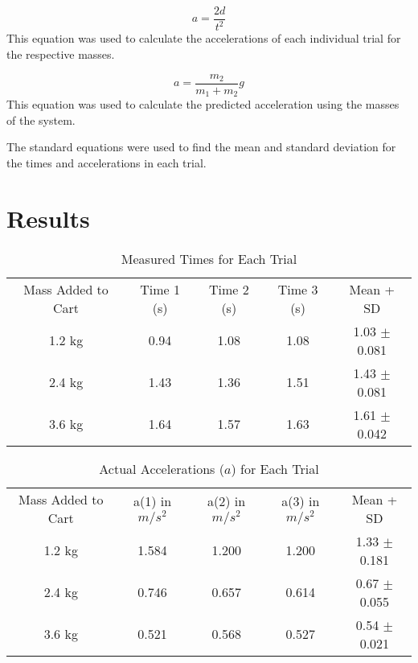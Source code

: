 \documentclass[reprint,amsmath,amssymb.aps]{revtex4-2}
\begin{document}
\begin{equation} 
a = \frac{2d}{t^2}
\label{eq:4} 
\end{equation}
This equation was used to calculate the accelerations of each individual trial for the respective masses. \cite{tipler}

\begin{equation} 
a = \dfrac{m_2}{m_1 + m_2} g
\label{eq:5}
\end{equation}
This equation was used to calculate the predicted acceleration using the masses of the system. \cite{tipler} 

The standard equations were used to find the mean and standard deviation for the times and accelerations in each trial.








\section{Results}
\begin{table} %
\centering
\begin{tabular}{ccccc}
  Mass Added to Cart & Time 1 (s) & Time 2 (s) & Time 3 (s) & Mean + SD \\ 
  1.2 kg& 0.94 & 1.08 & 1.08 & 1.03 $\pm$ 0.081\\ 
  2.4 kg& 1.43 & 1.36 & 1.51 & 1.43 $\pm$ 0.081 \\ 
  3.6 kg& 1.64 & 1.57 & 1.63 & 1.61 $\pm$ 0.042 \\ 
\end{tabular}
\caption{Measured Times for Each Trial} 
\label{Times of Trials} 
\end{table}

\begin{table} %
\centering
\begin{tabular}{ccccc}
  Mass Added to Cart & a(1) in $m/s^2$ & a(2) in $m/s^2$ & a(3) in $m/s^2$ & Mean + SD  \\ 
  1.2 kg& 1.584 & 1.200  & 1.200 & 1.33 $\pm$ 0.181\\ 
  2.4 kg& 0.746 & 0.657 & 0.614 & 0.67 $\pm$ 0.055 \\ 
  3.6 kg& 0.521 & 0.568 & 0.527 & 0.54 $\pm$ 0.021 \\ 
\end{tabular}
\caption{Actual Accelerations ($a$) for Each Trial}
\label{Accelerations for Each Trial} 
\end{table}
\end{document}
